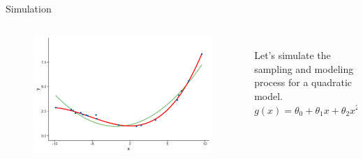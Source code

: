 \documentclass[aspectratio=169]{../latex_main/tntbeamer}  %
\begin{document}
	\begin{frame}[c]{Simulation}
	  \begin{columns}
	      \begin{column}{.6\textwidth}
	           \begin{figure}
	               \includegraphics[scale=.5]{Bild10}
	           \end{figure} 
	      \end{column}
	      
	      \begin{column}{.4\textwidth}
	      \\
	      \bigskip
	      \bigskip
	      \bigskip
	            Let’s simulate the sampling and modeling process for a quadratic model.\\
	            $g(x) = \theta_0 + \theta_1x + \theta_2x^2$
	      \end{column}
	  \end{columns}
	\end{frame}
	
\end{document}

